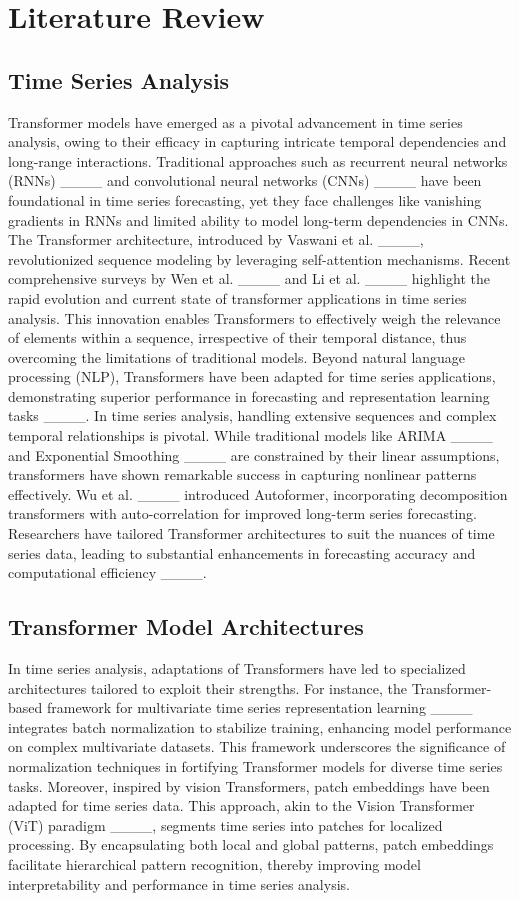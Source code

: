 \section{Literature Review}
\subsection{Time Series Analysis}
Transformer models have emerged as a pivotal advancement in time series analysis, owing to their efficacy in capturing intricate temporal dependencies and long-range interactions. Traditional approaches such as recurrent neural networks (RNNs) ____ and convolutional neural networks (CNNs) ____ have been foundational in time series forecasting, yet they face challenges like vanishing gradients in RNNs and limited ability to model long-term dependencies in CNNs. The Transformer architecture, introduced by Vaswani et al. ____, revolutionized sequence modeling by leveraging self-attention mechanisms. Recent comprehensive surveys by Wen et al. ____ and Li et al. ____ highlight the rapid evolution and current state of transformer applications in time series analysis.
This innovation enables Transformers to effectively weigh the relevance of elements within a sequence, irrespective of their temporal distance, thus overcoming the limitations of traditional models. Beyond natural language processing (NLP), Transformers have been adapted for time series applications, demonstrating superior performance in forecasting and representation learning tasks ____. In time series analysis, handling extensive sequences and complex temporal relationships is pivotal. While traditional models like ARIMA ____ and Exponential Smoothing ____ are constrained by their linear assumptions, transformers have shown remarkable success in capturing nonlinear patterns effectively. Wu et al. ____ introduced Autoformer, incorporating decomposition transformers with auto-correlation for improved long-term series forecasting. Researchers have tailored Transformer architectures to suit the nuances of time series data, leading to substantial enhancements in forecasting accuracy and computational efficiency ____.

\subsection{Transformer Model Architectures}
In time series analysis, adaptations of Transformers have led to specialized architectures tailored to exploit their strengths. For instance, the Transformer-based framework for multivariate time series representation learning ____ integrates batch normalization to stabilize training, enhancing model performance on complex multivariate datasets. This framework underscores the significance of normalization techniques in fortifying Transformer models for diverse time series tasks. Moreover, inspired by vision Transformers, patch embeddings have been adapted for time series data. This approach, akin to the Vision Transformer (ViT) paradigm ____, segments time series into patches for localized processing. By encapsulating both local and global patterns, patch embeddings facilitate hierarchical pattern recognition, thereby improving model interpretability and performance in time series analysis.


